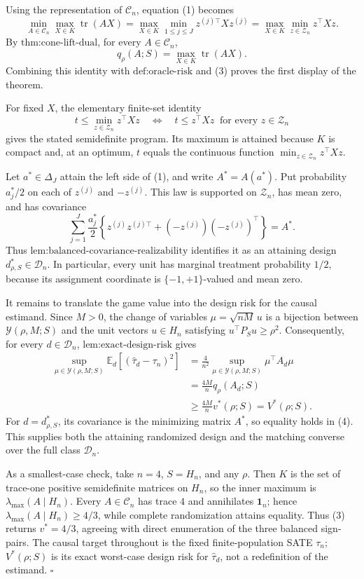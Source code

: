 Using the representation of \(\mathcal C_n\), equation (1) becomes
\[
\min_{A\in\mathcal C_n}\max_{X\in K}\operatorname{tr}(AX)
=
\max_{X\in K}\min_{1\leq j\leq J}z^{(j)\top}Xz^{(j)}
=
\max_{X\in K}\min_{z\in\mathcal Z_n}z^\top Xz.
\tag{3}
\]
By \(\text{thm:cone-lift-dual}\), for every \(A\in\mathcal C_n\),
\[
q_\rho(A;S)=\max_{X\in K}\operatorname{tr}(AX).
\]
Combining this identity with \(\text{def:oracle-risk}\) and (3) proves the first display of the theorem.

For fixed \(X\), the elementary finite-set identity
\[
t\leq\min_{z\in\mathcal Z_n}z^\top Xz
\quad\Longleftrightarrow\quad
t\leq z^\top Xz\ \text{ for every }z\in\mathcal Z_n
\]
gives the stated semidefinite program.  Its maximum is attained because \(K\) is compact and, at an optimum, \(t\) equals the continuous function \(\min_{z\in\mathcal Z_n}z^\top Xz\).

Let \(a^*\in\Delta_J\) attain the left side of (1), and write \(A^*=A(a^*)\).  Put probability \(a_j^*/2\) on each of \(z^{(j)}\) and \(-z^{(j)}\).  This law is supported on \(\mathcal Z_n\), has mean zero, and has covariance
\[
\sum_{j=1}^J\frac{a_j^*}{2}
\left\{z^{(j)}z^{(j)\top}+(-z^{(j)})(-z^{(j)})^\top\right\}=A^*.
\]
Thus \(\text{lem:balanced-covariance-realizability}\) identifies it as an attaining design \(d^*_{\rho,S}\in\mathcal D_n\).  In particular, every unit has marginal treatment probability \(1/2\), because its assignment coordinate is \(\{-1,+1\}\)-valued and mean zero.

It remains to translate the game value into the design risk for the causal estimand.  Since \(M>0\), the change of variables \(\mu=\sqrt{nM}\,u\) is a bijection between \(\mathcal Y(\rho,M;S)\) and the unit vectors \(u\in H_n\) satisfying \(u^\top P_Su\geq\rho^2\).  Consequently, for every \(d\in\mathcal D_n\), \(\text{lem:exact-design-risk}\) gives
\[
\begin{aligned}
\sup_{\mu\in\mathcal Y(\rho,M;S)}
\mathbb E_d\!\left[(\widehat\tau_d-\tau_n)^2\right]
&=\frac{4}{n^2}\sup_{\mu\in\mathcal Y(\rho,M;S)}\mu^\top A_d\mu\\
&=\frac{4M}{n}q_\rho(A_d;S)\\
&\geq\frac{4M}{n}v^*(\rho;S)
=V^*(\rho;S).
\end{aligned}
\tag{4}
\]
For \(d=d^*_{\rho,S}\), its covariance is the minimizing matrix \(A^*\), so equality holds in (4).  This supplies both the attaining randomized design and the matching converse over the full class \(\mathcal D_n\).

As a smallest-case check, take \(n=4\), \(S=H_n\), and any \(\rho\).  Then \(K\) is the set of trace-one positive semidefinite matrices on \(H_n\), so the inner maximum is \(\lambda_{\max}(A\mid H_n)\).  Every \(A\in\mathcal C_n\) has trace \(4\) and annihilates \(\mathbf 1_n\); hence \(\lambda_{\max}(A\mid H_n)\geq4/3\), while complete randomization attains equality.  Thus (3) returns \(v^*=4/3\), agreeing with direct enumeration of the three balanced sign-pairs.  The causal target throughout is the fixed finite-population SATE \(\tau_n\); \(V^*(\rho;S)\) is its exact worst-case design risk for \(\widehat\tau_d\), not a redefinition of the estimand. \(\square\)